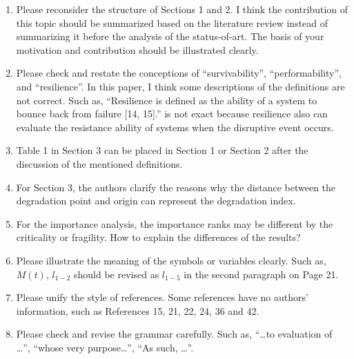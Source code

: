 \documentclass{article}
\begin{document}
\begin{enumerate}
  \item Please reconsider the structure of Sections 1 and 2. I think the contribution of this topic should be summarized based on the literature review instead of summarizing it before the analysis of the status-of-art. The basis of your motivation and contribution should be illustrated clearly.
  \item Please check and restate the conceptions of ``survivability'', ``performability'', and ``resilience''. In this paper, I think some descriptions of the definitions are not correct. Such as, ``Resilience is defined as the ability of a system to bounce back from failure [14, 15].'' is not exact because resilience also can evaluate the resistance ability of systems when the disruptive event occurs.
  \item Table 1 in Section 3 can be placed in Section 1 or Section 2 after the discussion of the mentioned definitions.
  \item For Section 3, the authors clarify the reasons why the distance between the degradation point and origin can represent the degradation index.
  \item For the importance analysis, the importance ranks may be different by the criticality or fragility. How to explain the differences of the results?
  \item Please illustrate the meaning of the symbols or variables clearly. Such as, $M(t)$, $l_{1-2}$ should be revised as $l_{1-5}$ in the second paragraph on Page 21.
  \item Please unify the style of references. Some references have no authors’ information, such as References 15, 21, 22, 24, 36 and 42.
  \item Please check and revise the grammar carefully. Such as, ``…to evaluation of …'', ``whose very purpose…'', ``As such, …''.
\end{enumerate}
\end{document}
